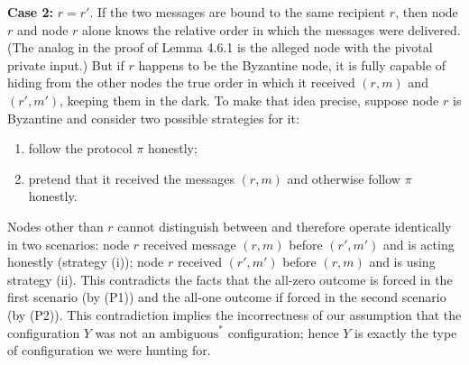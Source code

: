 \noindent
\textbf{Case 2:} $r = r'$. If the two messages are bound to the same recipient $r$, then node $r$ and
node $r$ alone knows the relative order in which the messages were delivered. (The analog in
the proof of Lemma 4.6.1 is the alleged node with the pivotal private input.) But if $r$ happens
to be the Byzantine node, it is fully capable of hiding from the other nodes the true order in
which it received $(r, m)$ and $(r', m')$, keeping them in the dark. To make that idea precise,
suppose node $r$ is Byzantine and consider two possible strategies for it:
\begin{enumerate}[label=(\roman*)]
    \item follow the protocol $\pi$ honestly;
    \item pretend that it received the messages $(r, m)$ and otherwise follow $\pi$ honestly.
\end{enumerate}
Nodes other than $r$ cannot distinguish between and therefore operate identically in two
scenarios: node $r$ received message $(r, m)$ before $(r', m')$ and is acting honestly (strategy (i));
node $r$ received $(r',m')$ before $(r, m)$ and is using strategy (ii). This contradicts the facts
that the all-zero outcome is forced in the first scenario (by (P1)) and the all-one outcome
if forced in the second scenario (by (P2)). This contradiction implies the incorrectness of
our assumption that the configuration $Y$ was not an $\text{ambiguous}^*$
configuration; hence $Y$ is exactly the type of configuration we were hunting for.

